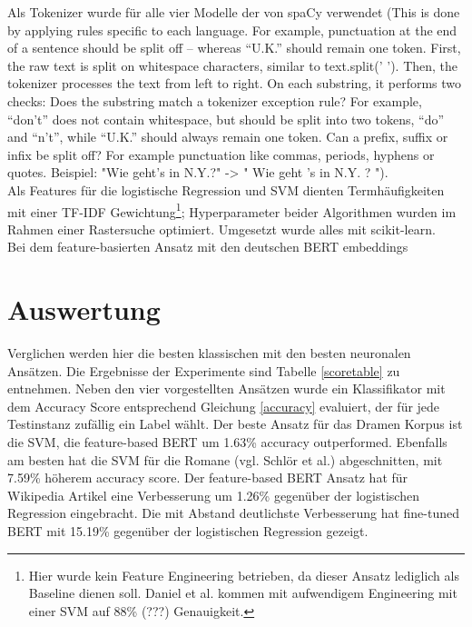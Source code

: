 Als Tokenizer wurde für alle vier Modelle der von spaCy verwendet (This is done by applying rules specific to each language. For example, punctuation at the end of a sentence should be split off – whereas “U.K.” should remain one token. First, the raw text is split on whitespace characters, similar to text.split(' '). Then, the tokenizer processes the text from left to right. On each substring, it performs two checks: Does the substring match a tokenizer exception rule? For example, “don’t” does not contain whitespace, but should be split into two tokens, “do” and “n’t”, while “U.K.” should always remain one token. Can a prefix, suffix or infix be split off? For example punctuation like commas, periods, hyphens or quotes. Beispiel: "Wie geht's in N.Y.?" -> " Wie geht 's in N.Y. ? ").\\

Als Features für die logistische Regression und SVM dienten Termhäufigkeiten mit einer TF-IDF Gewichtung\footnote{Hier wurde kein Feature Engineering betrieben, da dieser Ansatz lediglich als Baseline dienen soll. Daniel et al. kommen mit aufwendigem Engineering mit einer SVM auf 88\% (???) Genauigkeit.}; Hyperparameter beider Algorithmen wurden im Rahmen einer Rastersuche optimiert. Umgesetzt wurde alles mit scikit-learn.\\
Bei dem feature-basierten Ansatz mit den deutschen BERT embeddings 

\section{Auswertung}
\label{auswertung}

Verglichen werden hier die besten klassischen mit den besten neuronalen Ansätzen. Die Ergebnisse der Experimente sind Tabelle \ref{scoretable} zu entnehmen. Neben den vier vorgestellten Ansätzen wurde ein Klassifikator mit dem Accuracy Score entsprechend Gleichung \ref{accuracy} evaluiert, der für jede Testinstanz zufällig ein Label wählt. Der beste Ansatz für das Dramen Korpus ist die SVM, die feature-based BERT um 1.63\% accuracy outperformed. Ebenfalls am besten hat die SVM für die Romane (vgl. Schlör et al.) abgeschnitten, mit 7.59\% höherem accuracy score. Der feature-based BERT Ansatz hat für Wikipedia Artikel eine Verbesserung um 1.26\% gegenüber der logistischen Regression eingebracht. Die mit Abstand deutlichste Verbesserung hat fine-tuned BERT mit 15.19\% gegenüber der logistischen Regression gezeigt.


